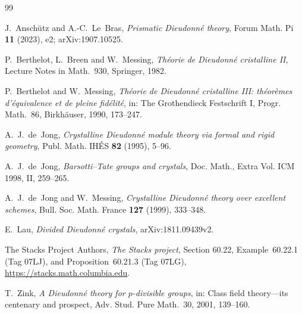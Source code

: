 \documentclass[11pt]{amsart}
\theoremstyle{remark}
\begin{document}
\begin{thebibliography}{99}

 J.~Ansch\"utz and A.-C.~Le~Bras, \emph{Prismatic Dieudonn\'e theory}, Forum Math. Pi \textbf{11} (2023),
e2; arXiv:1907.10525.

 P.~Berthelot, L.~Breen and W.~Messing, \emph{Th\'eorie de Dieudonn\'e cristalline II}, Lecture Notes in
Math.~930, Springer, 1982.

 P.~Berthelot and W.~Messing, \emph{Th\'eorie de Dieudonn\'e cristalline III: th\'eor\`emes d'\'equivalence et
de pleine fid\'elit\'e}, in: The Grothendieck Festschrift I, Progr. Math.~86, Birkh\"auser, 1990, 173--247.

 A.~J.~de~Jong, \emph{Crystalline Dieudonn\'e module theory via formal and rigid geometry},
Publ. Math. IH\'ES \textbf{82} (1995), 5--96.

 A.~J.~de~Jong, \emph{Barsotti--Tate groups and crystals}, Doc. Math., Extra Vol. ICM 1998, II, 259--265.

 A.~J.~de~Jong and W.~Messing, \emph{Crystalline Dieudonn\'e theory over excellent schemes},
Bull. Soc. Math. France \textbf{127} (1999), 333--348.

 E.~Lau, \emph{Divided Dieudonn\'e crystals}, arXiv:1811.09439v2.

 The Stacks Project Authors, \emph{The Stacks project}, Section 60.22, Example~60.22.1 (Tag 07LJ), and
Proposition~60.21.3 (Tag 07LG), \url{https://stacks.math.columbia.edu}.

 T.~Zink, \emph{A Dieudonn\'e theory for $p$-divisible groups}, in: Class field theory---its centenary
and prospect, Adv. Stud. Pure Math.~30, 2001, 139--160.

\end{thebibliography}
\end{document}
